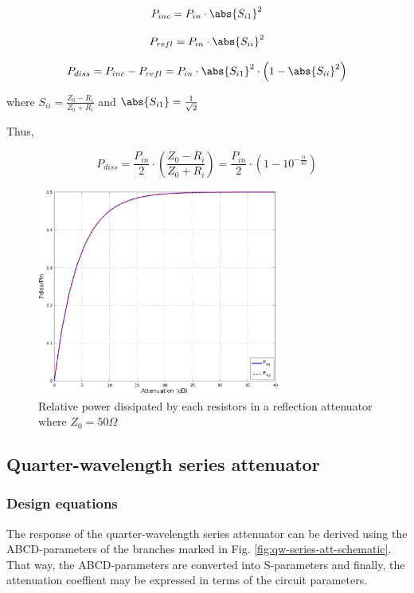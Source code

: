 \begin{equation}
P_{inc} = P_{in} \cdot \abs{S_{i1}}^2
\end{equation}

\begin{equation}
P_{refl} = P_{in} \cdot \abs{S_{ii}}^2
\end{equation}

\begin{equation}
P_{diss} = P_{inc} - P_{refl} = P_{in} \cdot \abs{S_{i1}}^2 \cdot \left( 1 - \abs{S_{ii}}^2\right)
\end{equation}

\noindent where $S_{ii} = \frac{Z_0 - R_i}{Z_0 + R_i}$ and $\abs{S_{i1}} = \frac{1}{\sqrt{2}}$

\noindent Thus, 

\begin{equation}
P_{diss} = \dfrac{P_{in}}{2} \cdot \left( \dfrac{Z_0 - R_i}{Z_0 + R_i}\right) = \dfrac{P_{in}}{2} \cdot \left( 1 - 10^{-\frac{\alpha}{10}}\right)
\end{equation}



\begin{figure}[ht]
\begin{center}
\includegraphics[width=8cm]{Relative-dissipated-reflection-attenuator}
\end{center}
\caption{Relative power dissipated by each resistors in a reflection attenuator where $Z_{0} = 50\Omega$}
\label{fig:reflec-attenuator-pow-diss}
\end{figure}
\FloatBarrier

\clearpage
\subsection{Quarter-wavelength series attenuator}
\subsubsection{Design equations}
\noindent The response of the quarter-wavelength series attenuator can be derived using the ABCD-parameters of the branches marked in Fig. \ref{fig:qw-series-att-schematic}. That way, the ABCD-parameters are converted into S-parameters and finally, the attenuation coeffient may be expressed in terms of the circuit parameters.


